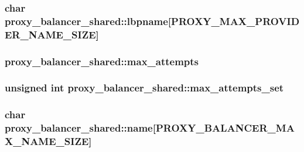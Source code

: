 \subsubsection[{\texorpdfstring{lbpname}{lbpname}}]{\setlength{\rightskip}{0pt plus 5cm}char proxy\+\_\+balancer\+\_\+shared\+::lbpname\mbox{[}{\bf P\+R\+O\+X\+Y\+\_\+\+M\+A\+X\+\_\+\+P\+R\+O\+V\+I\+D\+E\+R\+\_\+\+N\+A\+M\+E\+\_\+\+S\+I\+ZE}\mbox{]}}\hypertarget{structproxy__balancer__shared_ae91e8fbc2d6d2916f809f3250002cc02}{}\label{structproxy__balancer__shared_ae91e8fbc2d6d2916f809f3250002cc02}
\subsubsection[{\texorpdfstring{max\+\_\+attempts}{max_attempts}}]{ proxy\+\_\+balancer\+\_\+shared\+::max\+\_\+attempts}\hypertarget{structproxy__balancer__shared_ad833824113664468a7b47a2fd0f0a605}{}\label{structproxy__balancer__shared_ad833824113664468a7b47a2fd0f0a605}
\subsubsection[{\texorpdfstring{max\+\_\+attempts\+\_\+set}{max_attempts_set}}]{\setlength{\rightskip}{0pt plus 5cm}unsigned {\bf int} proxy\+\_\+balancer\+\_\+shared\+::max\+\_\+attempts\+\_\+set}\hypertarget{structproxy__balancer__shared_a046b0a40a6b54205ad896a60c3ada121}{}\label{structproxy__balancer__shared_a046b0a40a6b54205ad896a60c3ada121}
\subsubsection[{\texorpdfstring{name}{name}}]{\setlength{\rightskip}{0pt plus 5cm}char proxy\+\_\+balancer\+\_\+shared\+::name\mbox{[}{\bf P\+R\+O\+X\+Y\+\_\+\+B\+A\+L\+A\+N\+C\+E\+R\+\_\+\+M\+A\+X\+\_\+\+N\+A\+M\+E\+\_\+\+S\+I\+ZE}\mbox{]}}\hypertarget{structproxy__balancer__shared_add9785d20f633b360dfb06d79c2a29b7}{}\label{structproxy__balancer__shared_add9785d20f633b360dfb06d79c2a29b7}
